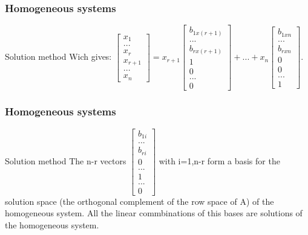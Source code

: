 \begin{frame}
	\frametitle{Homogeneous systems}
	\begin{block}{Solution method}
		Wich gives:
		$\begin{bmatrix}
			x_1\\...\\x_r\\x_{r+1}\\...\\x_n
		\end{bmatrix}=x_{r+1}\begin{bmatrix}
		b_{1x(r+1)}\\...\\b_{rx(r+1)}\\1\\0\\...\\0
		\end{bmatrix}+...+x_n\begin{bmatrix}
		b_{1xn}\\...\\b_{rxn}\\0\\0\\...\\1
		\end{bmatrix}$. 
	\end{block}
\end{frame}

\begin{frame}
	\frametitle{Homogeneous systems}
	\begin{block}{Solution method}
		The n-r vectors $\begin{bmatrix} b_{1i}\\...\\b_{ri}\\0\\...\\1\\...\\0 \end{bmatrix}$ with i=1,n-r form a basis for the solution space (the orthogonal complement of the row space of A) of the homogeneous system. All the linear commbinations of this bases are solutions of the homogeneous system. 
	\end{block}
\end{frame}

